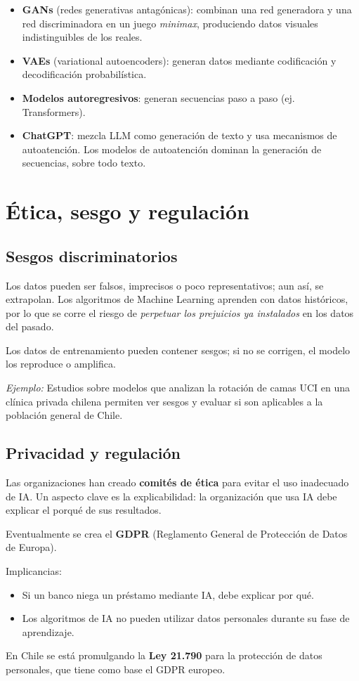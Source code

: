 \begin{itemize}[topsep=2pt,itemsep=1pt]
  \item \textbf{GANs} (redes generativas antagónicas): combinan una red generadora y una red  discriminadora en un juego \emph{minimax}, produciendo datos visuales indistinguibles de los reales.
  \item \textbf{VAEs} (variational autoencoders): generan datos mediante codificación y decodificación probabilística.
  \item \textbf{Modelos autoregresivos}: generan secuencias paso a paso (ej. Transformers).
  \item \textbf{ChatGPT}: mezcla LLM como generación de texto y usa mecanismos de autoatención. Los modelos de autoatención dominan la generación de secuencias, sobre todo texto.
\end{itemize}

\section{Ética, sesgo y regulación}

\subsection{Sesgos discriminatorios}

Los datos pueden ser falsos, imprecisos o poco representativos; aun así, se extrapolan. Los algoritmos de Machine Learning aprenden con datos históricos, por lo que se corre el riesgo de \emph{perpetuar los prejuicios ya instalados} en los datos del pasado.

\begin{advertencia}
Los datos de entrenamiento pueden contener sesgos; si no se corrigen, el modelo los reproduce o amplifica.
\end{advertencia}

\textit{Ejemplo:} Estudios sobre modelos que analizan la rotación de camas UCI en una clínica privada chilena permiten ver sesgos y evaluar si son aplicables a la población general de Chile.

\subsection{Privacidad y regulación}

Las organizaciones han creado \textbf{comités de ética} para evitar el uso inadecuado de IA. Un aspecto clave es la explicabilidad: la organización que usa IA debe explicar el porqué de sus resultados.

Eventualmente se crea el \textbf{GDPR} (Reglamento General de Protección de Datos de Europa).

Implicancias:
\begin{itemize}[topsep=2pt,itemsep=1pt]
  \item Si un banco niega un préstamo mediante IA, debe explicar por qué.
  \item Los algoritmos de IA no pueden utilizar datos personales durante su fase de aprendizaje.
\end{itemize}

En Chile se está promulgando la \textbf{Ley 21.790} para la protección de datos personales, que tiene como base el GDPR europeo.
